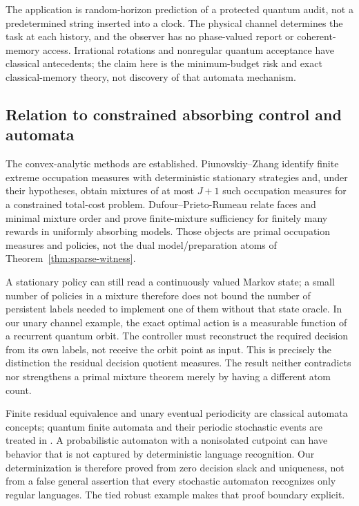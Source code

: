 The application is random-horizon prediction of a protected quantum audit, not a predetermined string inserted into a clock. The physical channel determines the task at each history, and the observer has no phase-valued report or coherent-memory access. Irrational rotations and nonregular quantum acceptance have classical antecedents; the claim here is the minimum-budget risk and exact classical-memory theory, not discovery of that automata mechanism.

\subsection{Relation to constrained absorbing control and automata}
The convex-analytic methods are established. Piunovskiy--Zhang \cite[Theorems 1--2 in the cited author text]{PiunovskiyZhang24} identify finite extreme occupation measures with deterministic stationary strategies and, under their hypotheses, obtain mixtures of at most $J+1$ such occupation measures for a constrained total-cost problem. Dufour--Prieto-Rumeau \cite[Theorems 4.3--4.4 and Proposition 4.5]{DufourMixtures} relate faces and minimal mixture order and prove finite-mixture sufficiency for finitely many rewards in uniformly absorbing models. Those objects are primal occupation measures and policies, not the dual model/preparation atoms of Theorem~\ref{thm:sparse-witness}.

A stationary policy can still read a continuously valued Markov state; a small number of policies in a mixture therefore does not bound the number of persistent labels needed to implement one of them without that state oracle. In our unary channel example, the exact optimal action is a measurable function of a recurrent quantum orbit. The controller must reconstruct the required decision from its own labels, not receive the orbit point as input. This is precisely the distinction the residual decision quotient measures. The result neither contradicts nor strengthens a primal mixture theorem merely by having a different atom count.

Finite residual equivalence and unary eventual periodicity are classical automata concepts; quantum finite automata and their periodic stochastic events are treated in \cite{Mereghetti24}. A probabilistic automaton with a nonisolated cutpoint can have behavior that is not captured by deterministic language recognition. Our determinization is therefore proved from zero decision slack and uniqueness, not from a false general assertion that every stochastic automaton recognizes only regular languages. The tied robust example makes that proof boundary explicit.

